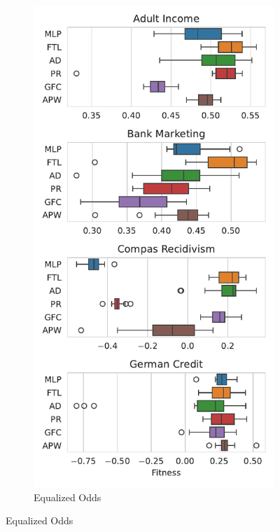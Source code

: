 \begin{figure}[!ht]
\begin{subfigure}{.32\linewidth}
\end{subfigure}
\begin{subfigure}{.32\linewidth}
    \caption{Equalized Odds}
    \label{fig:boxplot_mcc_odds}
    \includegraphics[width=1\linewidth]{images/boxplot_mcc_odds.pdf}
\end{subfigure}
\end{figure}

